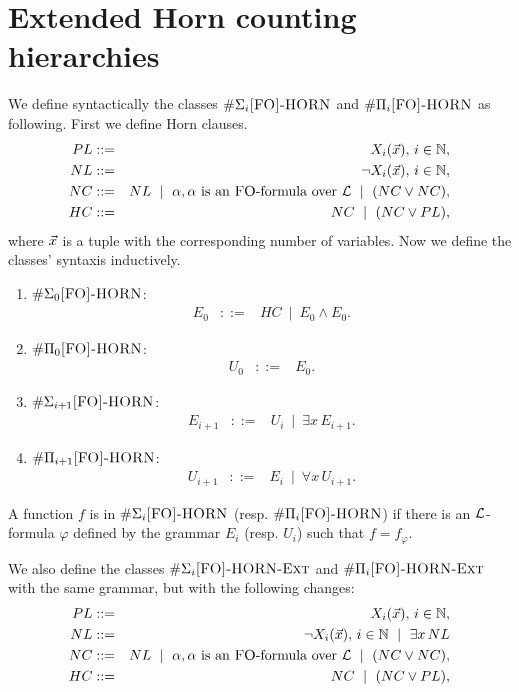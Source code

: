 \section{Extended Horn counting hierarchies}

We define syntactically the classes $\#\Sigma_{i}\textsc{[FO]-HORN}$ and $\#\Pi_{i}\textsc{[FO]-HORN}$ as following. First we define Horn clauses.
\begin{eqnarray*}
PL &::=& X_i(\vec{x}),\, i\in\mathbb{N},\\
NL &::=& \neg X_i(\vec{x}),\, i\in\mathbb{N},\\
NC &::=& NL \ \mid \ \alpha, \alpha \mbox{ is an {\sc FO}-formula over } {\cal L} \ \mid \ (NC \vee NC),\\
HC &::=& NC \ \mid \ (NC \vee PL),
\end{eqnarray*}
where $\vec{x}$ is a tuple with the corresponding number of variables. Now we define the classes' syntaxis inductively.
\begin{enumerate}
	\item $\#\Sigma_0\textsc{[FO]-HORN}$:
	\begin{eqnarray*}
	E_0 &::=& HC \ \mid \ E_0 \wedge E_0.
	\end{eqnarray*}
	\item $\#\Pi_0\textsc{[FO]-HORN}$:
	\begin{eqnarray*}
	U_0 &::=& E_0.
	\end{eqnarray*}
	\item $\#\Sigma_{i+1}\textsc{[FO]-HORN}$:
	\begin{eqnarray*}
	E_{i+1} &::=& U_i \ \mid \ \exists x \, E_{i+1}.
	\end{eqnarray*}
	\item $\#\Pi_{i+1}\textsc{[FO]-HORN}$:
	\begin{eqnarray*}
		U_{i+1} &::=& E_i \ \mid \ \forall x \, U_{i+1}.
	\end{eqnarray*}
\end{enumerate}
A function $f$ is in $\#\Sigma_{i}\textsc{[FO]-HORN}$ (resp. $\#\Pi_{i}\textsc{[FO]-HORN}$) if there is an ${\cal L}$-formula $\varphi$ defined by the grammar $E_i$ (resp. $U_i$) such that $f = f_{\varphi}$.

We also define the classes $\#\Sigma_{i}\textsc{[FO]-HORN-Ext}$ and $\#\Pi_{i}\textsc{[FO]-HORN-Ext}$ with the same grammar, but with the following changes:
\begin{eqnarray*}
	PL &::=& X_i(\vec{x}),\, i\in\mathbb{N},\\
	NL &::=& \neg X_i(\vec{x}),\, i\in\mathbb{N} \ \mid \ \exists x\, NL\\
	NC &::=& NL \ \mid \ \alpha, \alpha \mbox{ is an {\sc FO}-formula over } {\cal L} \ \mid \ (NC \vee NC),\\
	HC &::=& NC \ \mid \ (NC \vee PL),
\end{eqnarray*}